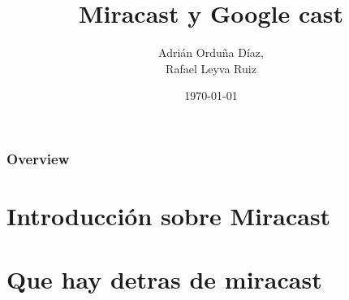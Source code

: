 \documentclass{beamer}
\title[Miracast]{Miracast y Google cast} %
\author{Adrián Orduña Díaz,\\ Rafael Leyva Ruiz} %
\institute[UGR] %
{
Universidad de Granada \\ %
\medskip
\textit{rafaelleru95103@correo.ugr.es \\
adrianod@correo.ugr.es} %
}
\date{\today} %
\begin{document}
\begin{frame}
\titlepage %
\end{frame}
\begin{frame}
\frametitle{Overview} %
\tableofcontents %
\end{frame}


\section{Introducción sobre Miracast} %









\section{Que hay detras de miracast}
\end{document}
